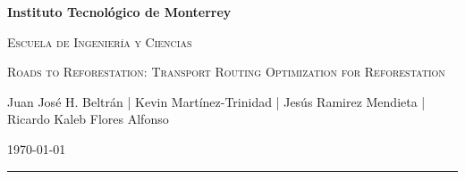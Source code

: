 \documentclass{amsart}
\begin{document}
    \begin{center}
        {\bfseries\LARGE Instituto Tecnológico de Monterrey\par}
        {\scshape\Large Escuela de Ingeniería y Ciencias\par}
        \vspace{0.5cm}
        {\scshape\Huge Roads to Reforestation: Transport Routing Optimization for Reforestation\par}
        \vspace{0.5cm}
        {\small Juan José H. Beltrán | Kevin Martínez-Trinidad | Jesús Ramirez Mendieta | Ricardo Kaleb Flores Alfonso\par}
        \vspace{0.3cm}
        {\small \today}
        \vspace{0.5cm}
        
        \rule{15.5cm}{0.1pt}
    \end{center}


\end{document}

